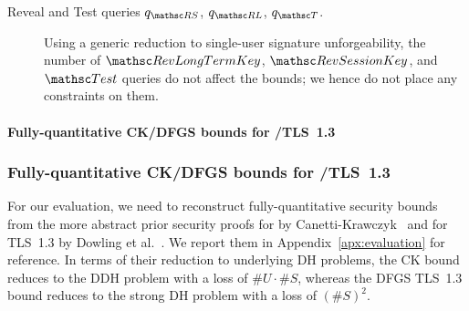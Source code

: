 \begin{description}
	
	\item[Reveal and Test queries $\qRevSessionKey$, $\qRevLongTermKey$, $\qTest$.]
	Using a generic reduction to single-user signature unforgeability, the number of $\RevLongTermKey$, $\RevSessionKey$, and $\Test$ queries do not affect the bounds;
	we hence do not place any constraints on them.
\end{description}




\iffull
\paragraph{Fully-quantitative CK/DFGS bounds for \SIGMA/TLS~1.3}
\else
\subsubsection*{Fully-quantitative CK/DFGS bounds for \SIGMA/TLS~1.3\lncsdot}
\fi

For our evaluation, we need to reconstruct fully-quantitative security bounds from the more abstract prior security proofs for \SIGMA by Canetti-Krawczyk~\cite{C:CanKra02} and for TLS~1.3 by Dowling et al.~\cite{JC:DFGS21}.
We report them in Appendix~\ref{apx:evaluation} for reference.
In terms of their reduction to underlying DH problems,
the CK \SIGMA bound reduces to the DDH problem with a loss of $\#U \cdot \#S$,
whereas the DFGS TLS~1.3 bound reduces to the strong DH problem with a loss of $(\#S)^2$.

